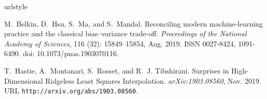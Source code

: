 \documentclass[a4paper,10pt]{article}
\begin{document}
% 
\begin{thebibliography}{2}
\providecommand{\natexlab}[1]{#1}
\providecommand{\url}[1]{\texttt{#1}}
\expandafter\ifx\csname urlstyle\endcsname\relax
  \providecommand{\doi}[1]{doi: #1}\else
  \providecommand{\doi}{doi: \begingroup \urlstyle{rm}\Url}\fi

M.~Belkin, D.~Hsu, S.~Ma, and S.~Mandal.
\newblock Reconciling modern machine-learning practice and the classical
  bias–variance trade-off.
\newblock \emph{Proceedings of the National Academy of Sciences}, 116
  (32): 15849--15854, Aug. 2019.
\newblock ISSN 0027-8424, 1091-6490.
\newblock \doi{10.1073/pnas.1903070116}.

T.~Hastie, A.~Montanari, S.~Rosset, and R.~J. Tibshirani.
\newblock Surprises in {High}-{Dimensional} {Ridgeless} {Least} {Squares}
  {Interpolation}.
\newblock \emph{arXiv:1903.08560}, Nov. 2019.
\newblock URL \url{http://arxiv.org/abs/1903.08560}.

\end{thebibliography}
\end{document}
